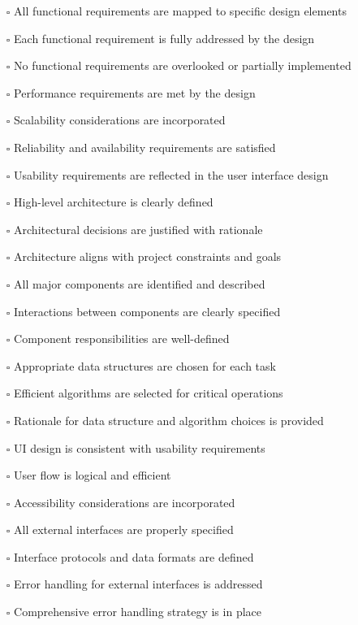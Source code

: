 \documentclass[12pt, titlepage]{article}
\begin{document}
\begin{itemize}
  \item[$\square$] All functional requirements are mapped to specific design elements 
  \item[$\square$] Each functional requirement is fully addressed by the design 
  \item[$\square$] No functional requirements are overlooked or partially implemented 
  \item[$\square$] Performance requirements are met by the design 
  \item[$\square$] Scalability considerations are incorporated 
  \item[$\square$] Reliability and availability requirements are satisfied 
  \item[$\square$] Usability requirements are reflected in the user interface design
  \item[$\square$] High-level architecture is clearly defined 
  \item[$\square$] Architectural decisions are justified with rationale 
  \item[$\square$] Architecture aligns with project constraints and goals 
  \item[$\square$] All major components are identified and described 
  \item[$\square$] Interactions between components are clearly specified 
  \item[$\square$] Component responsibilities are well-defined 
  \item[$\square$] Appropriate data structures are chosen for each task 
  \item[$\square$] Efficient algorithms are selected for critical operations 
  \item[$\square$] Rationale for data structure and algorithm choices is provided
  \item[$\square$] UI design is consistent with usability requirements 
  \item[$\square$] User flow is logical and efficient 
  \item[$\square$] Accessibility considerations are incorporated 
  \item[$\square$] All external interfaces are properly specified 
  \item[$\square$] Interface protocols and data formats are defined 
  \item[$\square$] Error handling for external interfaces is addressed 
  \item[$\square$] Comprehensive error handling strategy is in place

\end{itemize}
\end{document}
